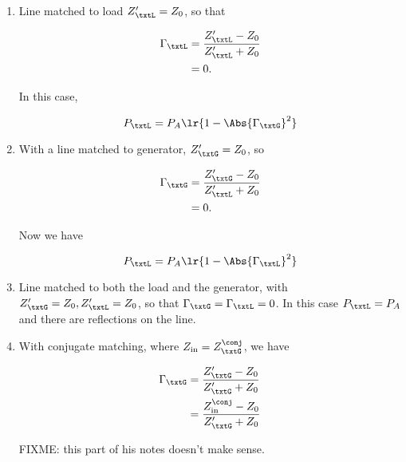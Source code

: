 \begin{enumerate}
\item Line matched to load \( Z_\txtL' = Z_0 \), so that

\begin{equation}\label{eqn:uwavesDeck6LCmatchingCore:80}
\begin{aligned}
\Gamma_\txtL
&= \frac{Z_\txtL' - Z_0}{Z_\txtL' + Z_0}
\\ &= 0.
\end{aligned}
\end{equation}

In this case,

\begin{equation}\label{eqn:uwavesDeck6LCmatchingCore:100}
P_\txtL = P_A \lr{ 1 - \Abs{\Gamma_\txtG}^2 }
\end{equation}

\item With a line matched to generator, \( Z_\txtG' = Z_0 \), so

\begin{equation}\label{eqn:uwavesDeck6LCmatchingCore:120}
\begin{aligned}
\Gamma_\txtG
&= \frac{Z_\txtG' - Z_0}{Z_\txtL' + Z_0}
\\ &= 0.
\end{aligned}
\end{equation}

Now we have

\begin{equation}\label{eqn:uwavesDeck6LCmatchingCore:140}
P_\txtL = P_A \lr{ 1 - \Abs{\Gamma_\txtL}^2 }
\end{equation}

\item Line matched to both the load and the generator, with \( Z_\txtG' = Z_0, Z_\txtL' = Z_0 \),
so that \( \Gamma_\txtG = \Gamma_\txtL = 0 \).
In this case \( P_\txtL = P_A \) and there are reflections on the line.

\item With conjugate matching, where \( Z_{\textrm{in}} = Z_\txtG^\conj \), we have

\begin{equation}\label{eqn:uwavesDeck6LCmatchingCore:160}
\begin{aligned}
\Gamma_\txtG
&= \frac{Z_\txtG' - Z_0}{Z_\txtG' + Z_0}
\\ &= \frac{Z_{\textrm{in}}^\conj - Z_0}{Z_\txtG' + Z_0}
\end{aligned}
\end{equation}

FIXME: this part of his notes doesn't make sense.

\end{enumerate}

